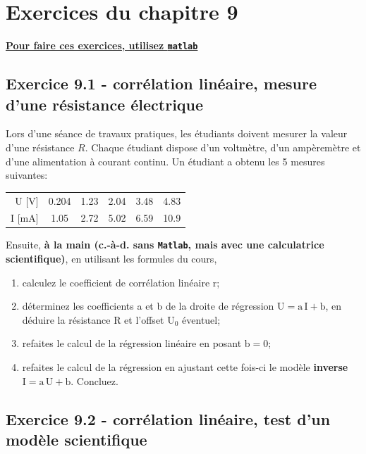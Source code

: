 \newpage

\section{Exercices du chapitre 9}

\begin{center}
\Large \bf {\underline{Pour faire ces exercices, utilisez \texttt{matlab}}}
\end{center}

\subsection*{Exercice 9.1 - corrélation linéaire, mesure d'une résistance électrique}

Lors d'une séance de travaux pratiques, les étudiants doivent mesurer la valeur d'une résistance $R$. Chaque étudiant dispose d'un voltmètre, d'un ampèremètre et d'une alimentation à courant continu. Un étudiant a obtenu les 5 mesures suivantes:
\begin{center}
\begin{tabular}{r|ccccc}
U [V] & 0.204 & 1.23 & 2.04 & 3.48 & 4.83\\
I [mA] & 1.05 & 2.72 & 5.02 & 6.59 & 10.9
\end{tabular}
\end{center}

Ensuite, \textbf{à la main (c.-à-d. sans \texttt{Matlab}, mais avec une calculatrice scientifique)}, en utilisant les formules du cours,
\begin{enumerate}
\item calculez le coefficient de corrélation linéaire r;
\item déterminez les coefficients a et b de la droite de régression $\text{U}=\text{a}\,\text{I}+\text{b}$, en déduire la résistance R et l'offset $\text{U}_0$ éventuel;
\item refaites le calcul de la régression linéaire en posant $\text{b}=0$;
\item refaites le calcul de la régression en ajustant cette fois-ci le modèle \textbf{inverse} $\text{I}=\text{a}\,\text{U}+\text{b}$. Concluez.
\end{enumerate}

\subsection*{Exercice 9.2 - corrélation linéaire, test d'un modèle scientifique}

